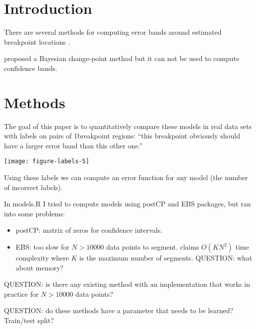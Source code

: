 \documentclass{article}
\begin{document}
\section{Introduction}

There are several methods for computing error bands around estimated
breakpoint locations \citep{Rigaill, Luong}.

\citet{Erdman} proposed a Bayesian change-point method but it can not
be used to compute confidence bands.

\section{Methods}

The goal of this paper is to quantitatively compare these models in
real data sets with labels on pairs of 1breakpoint regions: ``this
breakpoint obviously should have a larger error band than this other
one.'' 

\texttt{[image: figure-labels-5]}

Using these labels we can compute an error function for any model (the
number of incorrect labels).

In models.R I tried to compute models using postCP and EBS packages,
but ran into some problems:
\begin{itemize}
\item postCP: matrix of zeros for confidence intervals.
\item EBS: too slow for $N>10000$ data points to
  segment. \citet{Rigaill} claims $O(KN^2)$ time complexity where $K$
  is the maximum number of segments. QUESTION: what about memory?
\end{itemize}
QUESTION: is there any existing method with an implementation that
works in practice for $N>10000$ data points?

QUESTION: do these methods have a parameter that needs to be learned?
Train/test split?



\end{document}

